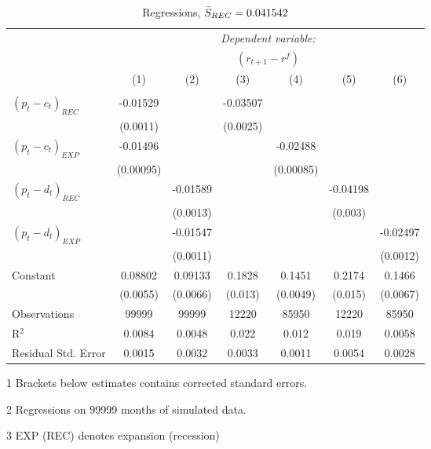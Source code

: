 \begin{table}[H]
\centering   
  \caption{Regressions, $\Bar{S}_{REC} = 0.041542$}           
  \label{tab:regress1}     
  \begin{threeparttable}
\begin{tabular}{@{\hspace{5pt}}l@{\hspace{5pt}}cccccc} 
\toprule 
 & \multicolumn{6}{c}{\textit{Dependent variable:}} \\ 
 & \multicolumn{6}{c}{$\left(r_{t+1}-r^f\right)$} \\ 
 \cmidrule(rr){2-7}
 & (1) & (2) & (3) & (4) & (5) & (6) \\ 
\midrule  
\\[-2.1ex] $\left( p_t - c_t \right)_{REC}$ &-0.01529& &-0.03507 & & &\\ 
  & (0.0011) & &(0.0025) & & & \\ 
 \addlinespace 
  $\left( p_t - c_t \right)_{EXP}$ &-0.01496  &    & &-0.02488 & &  \\ 
  & (0.00095) & & &(0.00085) & & \\ 
 \addlinespace 
  $\left( p_t - d_t \right)_{REC}$ & &-0.01589& & & -0.04198  &   \\ 
                                   & &  (0.0013) & & & (0.003) &    \\ 
 \addlinespace 
  $\left( p_t - d_t \right)_{EXP}$ & &   -0.01547& & & &-0.02497 \\ 
                                   & &  (0.0011) & & & &(0.0012) \\ 
 \addlinespace 
 Constant &0.08802 &0.09133&0.1828 &0.1451 &0.2174 &0.1466 \\ 
          &(0.0055) &(0.0066)&(0.013)&(0.0049)&(0.015)&(0.0067) \\ 
 \addlinespace 
\midrule  
Observations & 99999 & 99999&12220 & 85950&12220&85950\\
R$^{2}$ &0.0084 & 0.0048&0.022&0.012&0.019&0.0058 \\ 
Residual Std. Error &0.0015 & 0.0032&0.0033&0.0011&0.0054&0.0028 \\ 
\bottomrule 
\end{tabular} 
\begin{tablenotes}
\footnotesize{
\item[1] Brackets below estimates contains \citet{NW87} corrected standard errors. 
\item[2] Regressions on 99999 months of simulated data.
\item[3] EXP (REC) denotes expansion (recession)
}
\end{tablenotes}
\end{threeparttable}
\end{table} 
